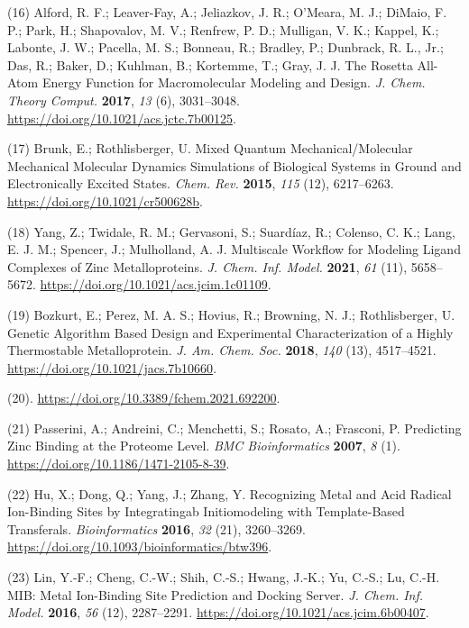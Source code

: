 \documentclass[  ASAPversion,
  ,
  9pt]{elife}
\newenvironment{cslreferences}%
  {}%
  {\par}
\begin{document}
\begin{cslreferences}
\leavevmode\hypertarget{ref-1uPiiMnD}{}%
(16) Alford, R. F.; Leaver-Fay, A.; Jeliazkov, J. R.; O'Meara, M. J.; DiMaio, F. P.; Park, H.; Shapovalov, M. V.; Renfrew, P. D.; Mulligan, V. K.; Kappel, K.; Labonte, J. W.; Pacella, M. S.; Bonneau, R.; Bradley, P.; Dunbrack, R. L., Jr.; Das, R.; Baker, D.; Kuhlman, B.; Kortemme, T.; Gray, J. J. The Rosetta All-Atom Energy Function for Macromolecular Modeling and Design. \emph{J. Chem. Theory Comput.} \textbf{2017}, \emph{13} (6), 3031--3048. \url{https://doi.org/10.1021/acs.jctc.7b00125}.

\leavevmode\hypertarget{ref-5Vxh8hay}{}%
(17) Brunk, E.; Rothlisberger, U. Mixed Quantum Mechanical/Molecular Mechanical Molecular Dynamics Simulations of Biological Systems in Ground and Electronically Excited States. \emph{Chem. Rev.} \textbf{2015}, \emph{115} (12), 6217--6263. \url{https://doi.org/10.1021/cr500628b}.

\leavevmode\hypertarget{ref-IXq7vmo3}{}%
(18) Yang, Z.; Twidale, R. M.; Gervasoni, S.; Suardíaz, R.; Colenso, C. K.; Lang, E. J. M.; Spencer, J.; Mulholland, A. J. Multiscale Workflow for Modeling Ligand Complexes of Zinc Metalloproteins. \emph{J. Chem. Inf. Model.} \textbf{2021}, \emph{61} (11), 5658--5672. \url{https://doi.org/10.1021/acs.jcim.1c01109}.

\leavevmode\hypertarget{ref-nlfa683y}{}%
(19) Bozkurt, E.; Perez, M. A. S.; Hovius, R.; Browning, N. J.; Rothlisberger, U. Genetic Algorithm Based Design and Experimental Characterization of a Highly Thermostable Metalloprotein. \emph{J. Am. Chem. Soc.} \textbf{2018}, \emph{140} (13), 4517--4521. \url{https://doi.org/10.1021/jacs.7b10660}.

\leavevmode\hypertarget{ref-b5EJeHX3}{}%
(20). \url{https://doi.org/10.3389/fchem.2021.692200}.

\leavevmode\hypertarget{ref-qNdK0F1w}{}%
(21) Passerini, A.; Andreini, C.; Menchetti, S.; Rosato, A.; Frasconi, P. Predicting Zinc Binding at the Proteome Level. \emph{BMC Bioinformatics} \textbf{2007}, \emph{8} (1). \url{https://doi.org/10.1186/1471-2105-8-39}.

\leavevmode\hypertarget{ref-KNmKWbrP}{}%
(22) Hu, X.; Dong, Q.; Yang, J.; Zhang, Y. Recognizing Metal and Acid Radical Ion-Binding Sites by Integratingab Initiomodeling with Template-Based Transferals. \emph{Bioinformatics} \textbf{2016}, \emph{32} (21), 3260--3269. \url{https://doi.org/10.1093/bioinformatics/btw396}.

\leavevmode\hypertarget{ref-1HMhB3vxM}{}%
(23) Lin, Y.-F.; Cheng, C.-W.; Shih, C.-S.; Hwang, J.-K.; Yu, C.-S.; Lu, C.-H. MIB: Metal Ion-Binding Site Prediction and Docking Server. \emph{J. Chem. Inf. Model.} \textbf{2016}, \emph{56} (12), 2287--2291. \url{https://doi.org/10.1021/acs.jcim.6b00407}.


\end{cslreferences}
\end{document}

